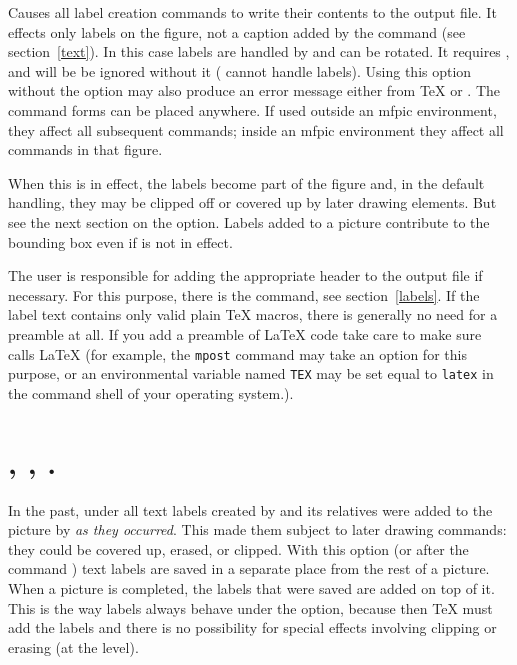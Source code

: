 \documentclass[letterpaper]{article}
\begin{document}
Causes all label creation commands to write their contents to the output
file. It effects only labels on the figure, not a caption added by the
 command (see section~\ref{text}).  In this case labels are
handled by \MP{} and can be rotated. It requires \MP{}, and will be be
ignored without it (\MF{} cannot handle labels). Using this option
without the  option may also produce an error message
either from \TeX{} or \MF{}. The command forms can be placed anywhere.
If used outside an mfpic environment, they affect all subsequent
 commands; inside an mfpic environment they affect all
 commands in that figure.

When this is in effect, the labels become part of the figure and, in the
default handling, they may be clipped off or covered up by later drawing
elements. But see the next section on the  option.
Labels added to a picture contribute to the bounding box even if
 is not in effect.

The user is responsible for adding the appropriate 
header to the output file if necessary. For this purpose, there is the
 command, see section~\ref{labels}. If the label text
contains only valid plain \TeX{} macros, there is generally no need for
a  preamble at all. If you add a 
preamble of \LaTeX{} code take care to make sure \MP{} calls \LaTeX{}
(for example, the \texttt{mpost} command may take an option for this
purpose, or an environmental variable named \texttt{TEX} may be set
equal to \texttt{latex} in the command shell of your operating system.).


\section{, , .}
\label{overlaylabels}
%
%

In the past, under  all text labels created by 
and its relatives were added to the picture by \MP{} \emph{as they
occurred}. This made them subject to later drawing commands: they could
be covered up, erased, or clipped. With this option (or after the
command ) text labels are saved in a separate place
from the rest of a picture. When a picture is completed, the labels that
were saved are added on top of it. This is the way labels always behave
under the  option, because then \TeX{} must add the labels
and there is no possibility for special effects involving clipping or
erasing (at the \MF{} level).
\end{document}
